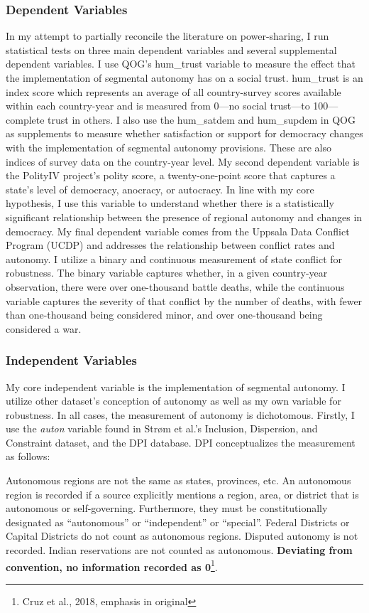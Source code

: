 \documentclass[12pt]{article}
\begin{document}
\subsubsection{Dependent Variables} 
In my attempt to partially reconcile the literature on power-sharing, I run statistical tests on three main dependent variables and several supplemental dependent variables. I use QOG’s hum\_trust variable to measure the effect that the implementation of segmental autonomy has on a social trust. hum\_trust is an index score which represents an average of all country-survey scores available within each country-year and is measured from 0—no social trust—to 100—complete trust in others. I also use the hum\_satdem and hum\_supdem in QOG as supplements to measure whether satisfaction or support for democracy changes with the implementation of segmental autonomy provisions. These are also indices of survey data on the country-year level. My second dependent variable is the PolityIV project’s polity score, a twenty-one-point score that captures a state’s level of democracy, anocracy, or autocracy. In line with my core hypothesis, I use this variable to understand whether there is a statistically significant relationship between the presence of regional autonomy and changes in democracy. My final dependent variable comes from the Uppsala Data Conflict Program (UCDP) and addresses the relationship between conflict rates and autonomy. I utilize a binary and continuous measurement of state conflict for robustness. The binary variable captures whether, in a given country-year observation, there were over one-thousand battle deaths, while the continuous variable captures the severity of that conflict by the number of deaths, with fewer than one-thousand being considered minor, and over one-thousand being considered a war. 

\subsubsection{Independent Variables} 
My core independent variable is the implementation of segmental autonomy. I utilize other dataset’s conception of autonomy as well as my own variable for robustness. In all cases, the measurement of autonomy is dichotomous. Firstly, I use the \textit{auton} variable found in Strøm et al.’s Inclusion, Dispersion, and Constraint dataset, and the DPI database. DPI conceptualizes the measurement as follows:

\singlespacing
Autonomous regions are not the same as states, provinces, etc. An autonomous region is recorded if a source explicitly mentions a region, area, or district that is autonomous or self-governing. Furthermore, they must be constitutionally designated as “autonomous” or “independent” or “special”. Federal Districts or Capital
Districts do not count as autonomous regions. Disputed autonomy is not recorded. Indian reservations are
not counted as autonomous. \textbf{Deviating from convention, no information recorded as 0}\footnote{Cruz et al., 2018, emphasis in original}.
\end{document}
